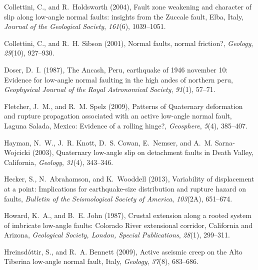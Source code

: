 \documentclass[draft,grl]{AGUTeX}
\begin{document}
\begin{article}
\begin{thebibliography}{32}
Collettini, C., and R.~Holdsworth (2004), Fault zone weakening and character of
  slip along low-angle normal faults: insights from the {Z}uccale fault,
  {E}lba, {I}taly, \textit{Journal of the Geological Society}, \textit{161}(6),
  1039--1051.

Collettini, C., and R.~H. Sibson (2001), Normal faults, normal friction?,
  \textit{Geology}, \textit{29}(10), 927--930.

Doser, D.~I. (1987), The {A}ncash, {P}eru, earthquake of 1946 november 10:
  Evidence for low-angle normal faulting in the high andes of northern peru,
  \textit{Geophysical Journal of the Royal Astronomical Society},
  \textit{91}(1), 57--71.

Fletcher, J.~M., and R.~M. Spelz (2009), Patterns of {Q}uaternary deformation
  and rupture propagation associated with an active low-angle normal fault,
  {L}aguna {S}alada, {M}exico: Evidence of a rolling hinge?,
  \textit{Geosphere}, \textit{5}(4), 385--407.

Hayman, N.~W., J.~R. Knott, D.~S. Cowan, E.~Nemser, and A.~M. Sarna-Wojcicki
  (2003), Quaternary low-angle slip on detachment faults in {D}eath {V}alley,
  {C}alifornia, \textit{Geology}, \textit{31}(4), 343--346.

Hecker, S., N.~Abrahamson, and K.~Wooddell (2013), Variability of displacement
  at a point: Implications for earthquake-size distribution and rupture hazard
  on faults, \textit{Bulletin of the Seismological Society of America},
  \textit{103}(2A), 651--674.

Howard, K.~A., and B.~E. John (1987), Crustal extension along a rooted system
  of imbricate low-angle faults: {Colorado River} extensional corridor,
  {California} and {Arizona}, \textit{Geological Society, London, Special
  Publications}, \textit{28}(1), 299--311.

Hreinsd{\'o}ttir, S., and R.~A. Bennett (2009), Active aseismic creep on the
  {Alto Tiberina} low-angle normal fault, {I}taly, \textit{Geology},
  \textit{37}(8), 683--686.


\end{thebibliography}
\end{article}
\end{document}

